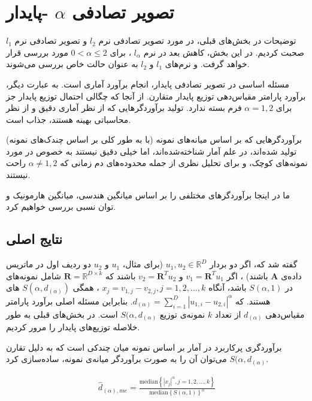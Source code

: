 \section{
تصویر تصادفی 
$\alpha$
-پایدار
}
توضیحات
در بخش‌های قبلی، در مورد تصویر تصادفی نرم 
$l_2$
و تصویر تصادفی نرم
$l_1$
صحبت کردیم. در این بخش، کاهش بعد در نرم 
$l_\alpha$
، برای 
$0 < \alpha \leq 2$
مورد بررسی قرار خواهد گرفت. و نرم‌های 
$l_1$
و 
$l_2$
به عنوان حالت خاص بررسی می‌شوند.

مسئله اساسی در تصویر تصادفی پایدار، انجام برآورد آماری است. به عبارت دیگر، برآورد پارامتر مقیاس‌دهی توزیع پایدار متقارن. از آنجا که  چگالی احتمال توزیع پایدار جز برای 
$\alpha = 1, 2$
فرم بسته‌ ندارد. تولید برآوردگرهایی که از نظر آماری دقیق و از نظر محاسباتی بهینه هستند، جذاب است.

برآوردگرهایی که بر اساس میانه‌های نمونه (با به طور کلی بر اساس چندک‌های نمونه) تولید شده‌اند، در علم آمار شناخته‌شده‌اند، اما خیلی دقیق نیستند به خصوص در مورد نمونه‌های کوچک، و برای تحلیل نظری از جمله محدوده‌های دم زمانی که 
$\alpha \neq 1, 2$
راحت نیستند. 

ما در اینجا برآوردگر‌های مختلفی را بر اساس میانگین هندسی، میانگین هارمونیک%
 و توان نسبی %
بررسی خواهیم کرد.


\subsection{
نتایج اصلی
}
گفته شد که، اگر دو بردار 
$u_1, u_2 \in \mathbb{R}^D$
(برای مثال،
$u_1$
و 
$u_2$
دو ردیف اول در ماتریس داده‌ی 
$\mathbf{A}$
باشند)
، اگر 
$v_1 = \mathbf{R}^T u_1$
و 
$v_2 = \mathbf{R}^T u_2$
باشند که 
$\mathbf{R} = \mathbb{R}^{D \times k}$
شامل نمونه‌های 
در 
$S(\alpha, 1)$
باشد، آنگاه 
$x_j = v_{1,j} - v_{2,j}, j = 1,2, \ldots, k$
، همگی
$S(\alpha, d_{(\alpha)})$
های 
هستند. که
$d_{(\alpha)} = \sum_{i=1}^D \left| u_{1,i} - u_{2,i} \right|^{\alpha}$.
بنابراین مسئله اصلی برآورد پارامتر مقیاس‌دهی 
$d_{(\alpha)}$
از تعداد 
$k$
نمونه‌ی 
توزیع
$S(\alpha, d_{(\alpha)}$
است. 
در بخش‌های قبلی به طور خلاصله توزیع‌های پایدار را مرور کردیم.

برآوردگری پرکاربرد در آمار بر اساس نمونه میان چندکی %
\cite{litez67, litez68, litez138}
است  که به دلیل تقارن 
$S(\alpha, d_{(\alpha)}$
می‌توان آن را به صورت برآوردگر میانه‌ی نمونه، ساده‌سازی کرد.

\begin{align}
\hat{d}_{(\alpha),me} = \frac
{ \mathrm{median} \left \{ \left| x_j \right|^{\alpha} , j = 1,2, \ldots, k \right \} }
{ \mathrm{median} \left \{ S(\alpha, 1) \right \}^{\alpha} }
\label{eq:1iW}
\end{align}

